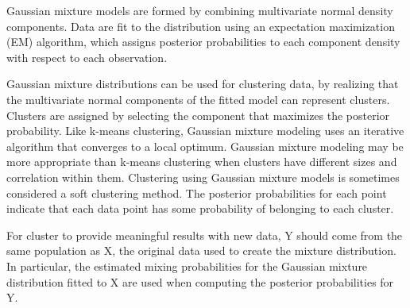 
Gaussian mixture models are formed by combining multivariate normal density components.
Data are fit to the distribution using an expectation maximization (EM) algorithm, which assigns posterior probabilities to each component density with respect to each observation.

Gaussian mixture distributions can be used for clustering data, by realizing that the multivariate normal components of the fitted model can represent clusters.
Clusters are assigned by selecting the component that maximizes the posterior probability. Like k-means clustering, Gaussian mixture modeling uses an iterative algorithm that converges to a local optimum. Gaussian mixture modeling may be more appropriate than k-means clustering when clusters have different sizes and correlation within them. Clustering using Gaussian mixture models is sometimes considered a soft clustering method. The posterior probabilities for each point indicate that each data point has some probability of belonging to each cluster.

For cluster to provide meaningful results with new data, Y should come from the same population as X, the original data used to create the mixture distribution. In particular, the estimated mixing probabilities for the Gaussian mixture distribution fitted to X are used when computing the posterior probabilities for Y.